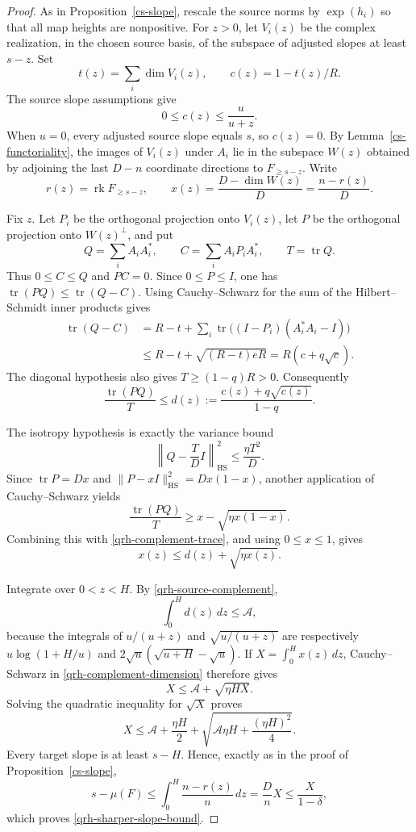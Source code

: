 \begin{proof}
As in Proposition~\ref{cs-slope}, rescale the source norms by
$\exp(h_i)$ so that all map heights are nonpositive. For $z>0$,
let $V_i(z)$ be the complex realization, in the chosen source basis,
of the subspace of adjusted slopes at least $s-z$. Set
\[
 t(z)=\sum_i\dim V_i(z),\qquad c(z)=1-t(z)/R.
\]
The source slope assumptions give
\begin{equation}\label{qrh-source-complement}
 0\le c(z)\le\frac{u}{u+z}.
\end{equation}
When $u=0$, every adjusted source slope equals $s$, so $c(z)=0$.
By Lemma~\ref{cs-functoriality}, the images of $V_i(z)$ under $A_i$
lie in the subspace $W(z)$ obtained by adjoining the last $D-n$
coordinate directions to $F_{\ge s-z}$. Write
\[
 r(z)=\operatorname{rk}F_{\ge s-z},\qquad
 x(z)=\frac{D-\dim W(z)}D=\frac{n-r(z)}D.
\]

Fix $z$. Let $P_i$ be the orthogonal projection onto $V_i(z)$,
let $P$ be the orthogonal projection onto $W(z)^\perp$, and put
\[
 Q=\sum_i A_iA_i^*,\qquad
 C=\sum_i A_iP_iA_i^*,\qquad T=\operatorname{tr}Q.
\]
Thus $0\le C\le Q$ and $PC=0$. Since $0\le P\le I$, one has
$\operatorname{tr}(PQ)\le\operatorname{tr}(Q-C)$.
Using Cauchy--Schwarz for the sum of the Hilbert--Schmidt inner
products gives
\begin{align*}
 \operatorname{tr}(Q-C)
 &=R-t+\sum_i\operatorname{tr}
       \bigl((I-P_i)(A_i^*A_i-I)\bigr)\\
 &\le R-t+\sqrt{(R-t)eR}
   =R(c+q\sqrt c).
\end{align*}
The diagonal hypothesis also gives $T\ge(1-q)R>0$.
Consequently
\begin{equation}\label{qrh-complement-trace}
 \frac{\operatorname{tr}(PQ)}T
       \le d(z):=\frac{c(z)+q\sqrt{c(z)}}{1-q}.
\end{equation}

The isotropy hypothesis is exactly the variance bound
\[
 \left\|Q-\frac TD I\right\|_{\mathrm{HS}}^2
       \le\frac{\eta T^2}D.
\]
Since $\operatorname{tr}P=Dx$ and
$\|P-xI\|_{\mathrm{HS}}^2=Dx(1-x)$, another application of
Cauchy--Schwarz yields
\[
 \frac{\operatorname{tr}(PQ)}T
 \ge x-\sqrt{\eta x(1-x)}.
\]
Combining this with \eqref{qrh-complement-trace}, and using
$0\le x\le1$, gives
\begin{equation}\label{qrh-complement-dimension}
 x(z)\le d(z)+\sqrt{\eta x(z)}.
\end{equation}

Integrate over $0<z<H$. By \eqref{qrh-source-complement},
\[
 \int_0^H d(z)\,dz\le\mathcal A,
\]
because the integrals of $u/(u+z)$ and
$\sqrt{u/(u+z)}$ are respectively
$u\log(1+H/u)$ and
$2\sqrt u(\sqrt{u+H}-\sqrt u)$.
If $X=\int_0^H x(z)\,dz$, Cauchy--Schwarz in
\eqref{qrh-complement-dimension} therefore gives
\[
 X\le\mathcal A+\sqrt{\eta HX}.
\]
Solving the quadratic inequality for $\sqrt X$ proves
\[
 X\le\mathcal A+\frac{\eta H}{2}
              +\sqrt{\mathcal A\eta H+\frac{(\eta H)^2}{4}}.
\]
Every target slope is at least $s-H$. Hence, exactly as in the
proof of Proposition~\ref{cs-slope},
\[
 s-\mu(F)\le\int_0^H\frac{n-r(z)}n\,dz
       =\frac Dn X\le\frac X{1-\delta},
\]
which proves \eqref{qrh-sharper-slope-bound}.


\end{proof}
